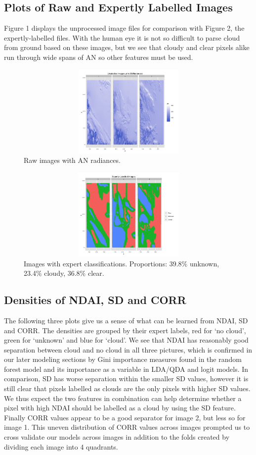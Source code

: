 \documentclass{article}\usepackage[]{graphicx}\usepackage[]{color}
\begin{document}
\subsection{Plots of Raw and Expertly Labelled Images}
Figure 1 displays the unprocessed image files for comparison with Figure 2, the expertly-labelled files. With the human eye it is not so difficult to parse cloud from ground based on these images, but we see that cloudy and clear pixels alike run through wide spans of AN so other features must be used.
\begin{figure}[h]
\includegraphics[width = 18cm, height=4.5cm]{RAWEDA.png}
\caption{Raw images with AN radiances.}
\end{figure}

\begin{figure}[h]
\includegraphics[width = 18cm, height=4.5cm]{EXPERTSEDA.png}
\caption{Images with expert classifications. Proportions: 39.8$\%$ unknown, 23.4$\%$ cloudy, 36.8$\%$ clear.}
\end{figure}
\subsection{Densities of NDAI, SD and CORR}

The following three plots give us a sense of what can be learned from NDAI, SD and CORR.  The densities are grouped by their expert labels, red for `no cloud', green for `unknown' and blue for `cloud'. We see that NDAI has reasonably good separation between cloud and no cloud in all three pictures, which is confirmed in our later modeling sections by Gini importance measures found in the random forest model and its importance as a variable in LDA/QDA and logit models. In comparison, SD has worse separation within the smaller SD values, however it is still clear that pixels labelled as clouds are the only pixels with higher SD values.  We thus expect the two features in combination can help determine whether a pixel with high NDAI should be labelled as a cloud by using the SD feature.  Finally CORR values appear to be a good separator for image 2, but less so for image 1.  This uneven distribution of CORR values across images prompted us to cross validate our models across images in addition to the folds created by dividing each image into 4 quadrants. 
\end{document}
